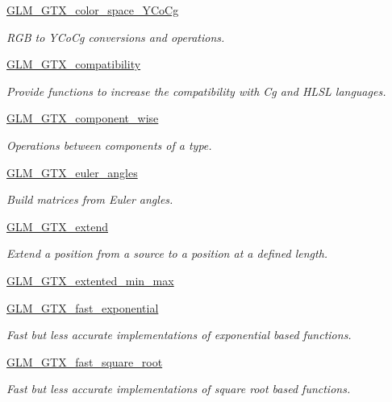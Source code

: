 \begin{DoxyCompactItemize}
\hyperlink{group__gtx__color__space___y_co_cg}{G\+L\+M\+\_\+\+G\+T\+X\+\_\+color\+\_\+space\+\_\+\+Y\+Co\+Cg}
\begin{DoxyCompactList}\small\item\em R\+G\+B to Y\+Co\+Cg conversions and operations. \end{DoxyCompactList}\item 
\hyperlink{group__gtx__compatibility}{G\+L\+M\+\_\+\+G\+T\+X\+\_\+compatibility}
\begin{DoxyCompactList}\small\item\em Provide functions to increase the compatibility with Cg and H\+L\+S\+L languages. \end{DoxyCompactList}\item 
\hyperlink{group__gtx__component__wise}{G\+L\+M\+\_\+\+G\+T\+X\+\_\+component\+\_\+wise}
\begin{DoxyCompactList}\small\item\em Operations between components of a type. \end{DoxyCompactList}\item 
\hyperlink{group__gtx__euler__angles}{G\+L\+M\+\_\+\+G\+T\+X\+\_\+euler\+\_\+angles}
\begin{DoxyCompactList}\small\item\em Build matrices from Euler angles. \end{DoxyCompactList}\item 
\hyperlink{group__gtx__extend}{G\+L\+M\+\_\+\+G\+T\+X\+\_\+extend}
\begin{DoxyCompactList}\small\item\em Extend a position from a source to a position at a defined length. \end{DoxyCompactList}\item 
\hyperlink{group__gtx__extented__min__max}{G\+L\+M\+\_\+\+G\+T\+X\+\_\+extented\+\_\+min\+\_\+max}
\item 
\hyperlink{group__gtx__fast__exponential}{G\+L\+M\+\_\+\+G\+T\+X\+\_\+fast\+\_\+exponential}
\begin{DoxyCompactList}\small\item\em Fast but less accurate implementations of exponential based functions. \end{DoxyCompactList}\item 
\hyperlink{group__gtx__fast__square__root}{G\+L\+M\+\_\+\+G\+T\+X\+\_\+fast\+\_\+square\+\_\+root}
\begin{DoxyCompactList}\small\item\em Fast but less accurate implementations of square root based functions. \end{DoxyCompactList}\item 

\end{DoxyCompactItemize}
